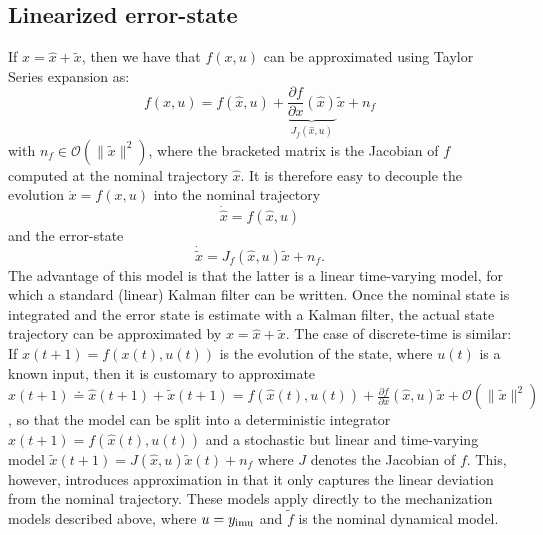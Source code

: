 {\subsection{Linearized error-state}
%
If $x = \hat x + \tilde x$, then we have that $f(x,u)$ can be approximated using Taylor Series expansion as:
\begin{equation}
f(x, u)  = f(\hat x, u) + \underbrace{\frac{\partial f}{\partial x}(\hat x)}_{J_f(\hat x,u)}\tilde x + n_f
\end{equation}
with $n_f \in {\mathcal O}(\| \tilde x\|^2)$, where the bracketed matrix is the Jacobian of $f$ computed at the nominal trajectory $\hat x$. It is therefore easy to decouple the evolution $\dot x = f(x, u)$ into the nominal trajectory
\begin{equation}
\dot {\hat x} = f(\hat x, u)
\end{equation}
and the error-state
\begin{equation}
\dot{\tilde x} = J_f(\hat x,u) \tilde x + n_f.
\end{equation}
The advantage of this model is that the latter is a linear time-varying model, for which a standard (linear) Kalman filter can be written. Once the nominal state is integrated and the error state is estimate with a Kalman filter, the actual state trajectory can be approximated by $x = \hat x + \tilde x$.
%
The case of discrete-time is similar: If $x(t+1) = f(x(t), u(t))$ is the evolution of the state, where $u(t)$ is a known input, then it is customary to approximate $x(t+1) \doteq \hat x(t+1) + \tilde x(t+1) = f(\hat x(t), u(t)) + \frac{\partial f}{\partial x}(\hat x,u) \tilde x + {\mathcal O}(\| \tilde x \|^2)$, so that the model can be split into a deterministic integrator $\hat x(t+1) = f(\hat x(t), u(t))$ and a stochastic but linear and time-varying model $\tilde x(t+1) = J(\hat x,u)\tilde x(t) + n_f$ where $J$ denotes the Jacobian of $f$. This, however, introduces approximation in that it only captures the linear deviation from the nominal trajectory. 
%
These models apply directly to the mechanization models described above, where $u = y_\mathrm{imu} $ and $\tilde f$ is the nominal dynamical model. 
%
}
